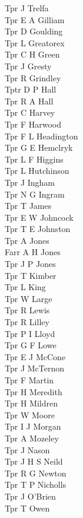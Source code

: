 \begin{multicols}{2}
  Tpr J Trelfa \\
  Tpr E A Gilliam \\
  Tpr D Goulding \\
  Tpr L Greatorex \\
  Tpr C H Green \\
  Tpr J Gresty \\
  Tpr R Grindley \\
  Tptr D P Hall \\
  Tpr R A Hall \\
  Tpr C Harvey \\
  Tpr F Harwood \\
  Tpr F L Headington \\
  Tpr G E Hemclryk \\
  Tpr L F Higgins \\
  Tpr L Hutchinson \\
  Tpr J Ingham \\
  Tpr N G Ingram \\
  Tpr T James \\
  Tpr E W Johncock \\
  Tpr T E Johnston \\
  Tpr A Jones \\
  Farr A H Jones \\
  Tpr J P Jones \\
  Tpr T Kimber \\
  Tpr L King \\
  Tpr W Large \\
  Tpr R Lewis \\
  Tpr R Lilley \\
  Tpr P I Lloyd \\
  Tpr G F Lowe \\
  Tpr E J McCone \\
  Tpr J McTernon \\
  Tpr F Martin \\
  Tpr H Meredith \\
  Tpr H Mildren \\
  Tpr W Moore \\
  Tpr I J Morgan \\
  Tpr A Mozeley \\
  Tpr J Nason \\
  Tpr J H S Neild \\
  Tpr R G Newton \\
  Tpr T P Nicholls \\
  Tpr J O'Brien \\
  Tpr T Owen \\

\end{multicols}
